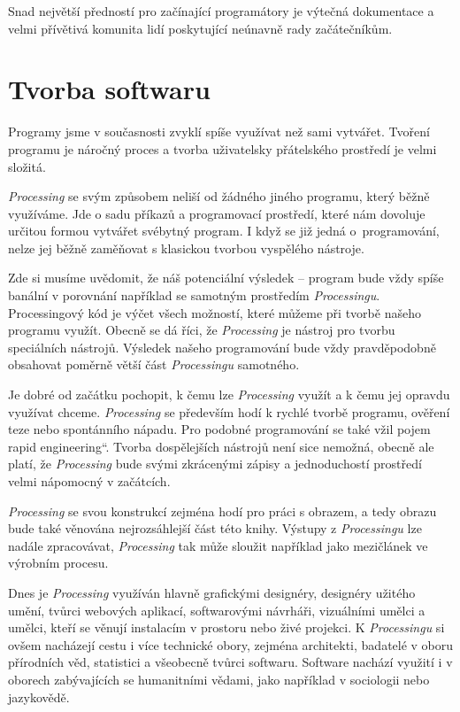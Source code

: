 \documentclass[10pt,twoside=true,open=right,cleardoublepage=empty,chapterprefix=true]{scrbook}
\renewcommand\uv[1]{\quotedblbase #1\textquotedblleft}%
\newcommand{\oddil}[1]{\section{#1}\index{#1}\label{#1}}
\newcommand{\lnb}{\linebreak}
\begin{document}
Snad největší předností pro začínající programátory je výtečná dokumentace a velmi přívětivá komunita lidí poskytující neúnavně rady začátečníkům.


\oddil{Tvorba softwaru}

Programy jsme v současnosti zvyklí spíše využívat než sami vytvářet. Tvoření programu je náročný proces a tvorba uživatelsky přátelského prostředí je velmi složitá.

{\em Processing} se svým způsobem neliší od žádného jiného programu, který běžně využíváme. Jde o sadu příkazů a programovací prostředí, které nám dovoluje určitou formou vytvářet svébytný program. I když se již jedná o~programování, nelze jej běžně zaměňovat s klasickou tvorbou vyspělého nástroje.

Zde si musíme uvědomit, že náš potenciální výsledek -- program bude vždy spíše banální v porovnání například se samotným prostředím {\em Processingu}. Processingový kód je výčet všech možností, které můžeme při tvorbě našeho programu využít. Obecně se dá říci, že {\em Processing} je nástroj pro tvorbu speciálních nástrojů. Výsledek našeho programování bude vždy pravděpodobně obsahovat poměrně větší část {\em Processingu} samotného.

Je dobré od začátku pochopit, k čemu lze {\em Processing} využít a k čemu jej opravdu využívat chceme. {\em Processing} se především hodí k rychlé tvorbě programu, ověření teze nebo spontánního nápadu. Pro podobné programování se také vžil pojem \uv{rapid engineering}. Tvorba dospělejších nástrojů není sice nemožná, obecně ale platí, že {\em Processing} bude svými zkrácenými zápisy a jednoduchostí prostředí velmi nápomocný v začátcích. 

{\em Processing} se svou konstrukcí zejména hodí pro práci s obrazem, \lnb a tedy obrazu bude také věnována nejrozsáhlejší část této knihy. Výstupy \lnb z {\em Processingu} lze nadále zpracovávat, {\em Processing} tak může sloužit například jako mezičlánek ve výrobním procesu.

Dnes je {\em Processing} využíván hlavně grafickými designéry, designéry užitého umění, tvůrci webových aplikací, softwarovými návrháři, \lnb vizuálními umělci a umělci, kteří se věnují instalacím v prostoru nebo živé projekci. K {\em Processingu} si ovšem nacházejí cestu i více technické obory, zejména architekti, badatelé v oboru přírodních věd, statistici a všeobecně tvůrci softwaru. Software nachází využití i v oborech zabývajících se humanitními vědami, jako například v sociologii nebo jazykovědě.
\end{document}
